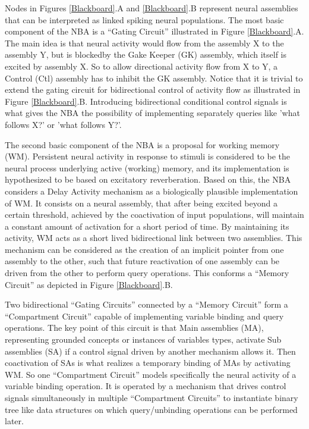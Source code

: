 \documentclass[10pt]{article}
\begin{document}
Nodes in Figures {\ref{Blackboard}}.A and {\ref{Blackboard}}.B represent neural assemblies that can be interpreted as linked spiking neural populations.
The most basic component of the NBA is a ``Gating Circuit'' illustrated in Figure {\ref{Blackboard}}.A.
The main idea is that neural activity would flow from the assembly X to the assembly Y, but is blockedby the Gake Keeper (GK) assembly, 
which itself is excited by assembly X.
So to allow directional activity flow from X to Y, a Control (Ctl) assembly has to inhibit the GK assembly.
Notice that it is trivial to extend the gating circuit for bidirectional control of activity flow as illustrated in Figure {\ref{Blackboard}}.B.
Introducing bidirectional conditional control signals is what gives the NBA the possibility of implementing separately queries like 'what follows X?' or 'what follows Y?'.

The second basic component of the NBA is a proposal for working memory (WM).
Persistent neural activity in response to stimuli is considered to be the neural process underlying active (working) memory, and its implementation is hypothesized to be based on excitatory reverberation\cite{wang2001synaptic}.
Based on this, the NBA considers a Delay Activity\cite{de_Kamps_2005} mechanism as a biologically plausible implementation of WM. It consists on a neural assembly, that after being excited beyond a certain threshold, achieved by the coactivation of input populations, will maintain a constant amount of activation for a short period of time. By maintaining its activity, WM acts as a short lived bidirectional link between two assemblies. This mechanism can be considered as the creation of an implicit pointer from one assembly to the other, such that future reactivation of one assembly can be driven from the other to perform query operations. This conforms a ``Memory Circuit'' as depicted in Figure {\ref{Blackboard}}.B.

Two bidirectional ``Gating Circuits'' connected by a ``Memory Circuit'' form a ``Compartment Circuit'' capable of implementing variable binding and query operations.
The key point of this circuit is that Main assemblies (MA), representing grounded concepts or instances of variables types, activate Sub assemblies (SA) if a control signal driven by another mechanism allows it.
Then coactivation of SAs is what realizes a temporary binding of MAs by activating WM.
So one ``Compartment Circuit'' models specifically the neural activity of a variable binding operation.
It is operated by a mechanism that drives control signals simultaneously in multiple ``Compartment Circuits'' to instantiate binary tree like data structures on which query/unbinding operations can be performed later. 
\end{document}
